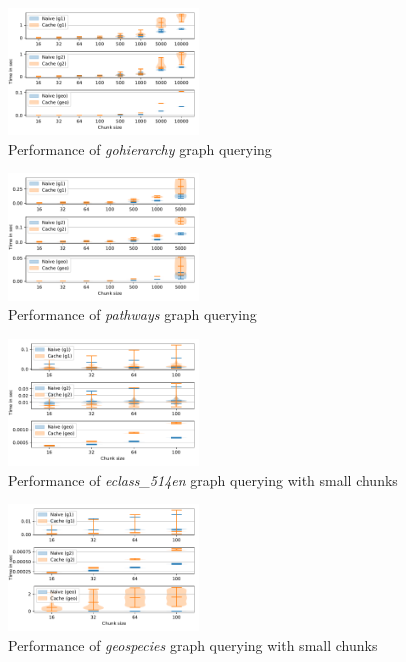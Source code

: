 \begin{figure}[h]
\centering
\includegraphics[width=0.45\textwidth]{data/raw/gohierarchy.pdf}
\caption{Performance of \textit{gohierarchy} graph querying}
\label{fig:python_gohierarchy_all}
\end{figure}


\begin{figure}[h]
\centering
\includegraphics[width=0.45\textwidth]{data/raw/pathways.pdf}
\caption{Performance of \textit{pathways} graph querying}
\label{fig:python_pathways_all}
\end{figure}

\begin{figure}[h]
\centering
\includegraphics[width=0.45\textwidth]{data/raw/eclass_514en_4.pdf}
\caption{Performance of \textit{eclass\_514en} graph querying with small chunks}
\label{fig:python_eclass_small}
\end{figure}

\begin{figure}[h]
\centering
\includegraphics[width=0.45\textwidth]{data/raw/geospecies_4.pdf}
\caption{Performance of \textit{geospecies} graph querying with small chunks}
\label{fig:python_geospecies_small}
\end{figure}

